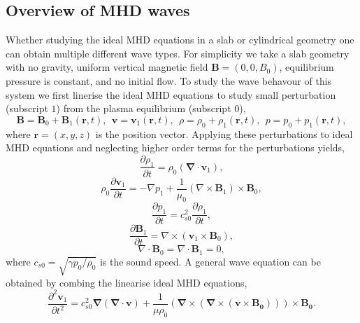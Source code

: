 \documentclass[12pt]{ociamthesis}
\newcommand{\bs}[1]{\boldsymbol{#1}}
\newcommand{\bn}{\boldsymbol{\nabla}}
\begin{document}
\subsection{Overview of MHD waves}
\label{section:kink_saus}
Whether studying the ideal MHD equations in a slab or cylindrical geometry one can obtain multiple different wave types. For simplicity we take a slab geometry with no gravity, uniform vertical magnetic field $\bs{B}=(0,0,B_0)$, equilibrium pressure is constant, and no initial flow. To study the wave behavour of this system we first linerise the ideal MHD equations to study small perturbation (subscript $1$) from the plasma equilibrium (subscript $0$), 
\begin{equation} \label{eq91}
\boldsymbol{B} = \boldsymbol{B}_0 + \boldsymbol{B}_1 (\boldsymbol{r},t) , \ \ \boldsymbol{v} = \boldsymbol{v}_1 (\boldsymbol{r}, t) , \ \ \rho = \rho_0 + \rho_1 ( \boldsymbol{r},t) , \ \ p = p_0 + p_1 ( \boldsymbol{r}, t) ,
\end{equation}
where $\bs{r} = (x,y,z)$ is the position vector. Applying these perturbations to ideal MHD equations and neglecting higher order terms for the perturbations yields,
\begin{equation}
\frac{\partial \rho_1}{\partial t} = \rho_0 ( \bn \cdot \boldsymbol{v}_1),
\end{equation}
\begin{equation}
\rho_0 \frac{\partial \boldsymbol{v}_1}{\partial t}  = - \nabla p_1 + \frac{1}{\mu_0} (\nabla \times \boldsymbol{B}_1) \times \boldsymbol{B}_0,
\end{equation}
\begin{equation}
\frac{\partial p_1}{\partial t} = c^2_{s0}  \frac{\partial \rho_1}{ \partial t},
\end{equation}
\begin{equation}
\frac{\partial \boldsymbol{B}_1}{\partial t} = \nabla \times (\boldsymbol{v}_1 \times \boldsymbol{B}_0),
\end{equation}
\begin{equation}
\nabla \cdot \boldsymbol{B}_0 = \nabla \cdot \boldsymbol{B}_1 = 0 ,
\end{equation}
where $c_{s0} = \sqrt{\gamma p_0/ \rho_0}$ is the sound speed. A general wave equation can be obtained by combing the linearise ideal MHD equations,
\begin{equation}\label{wave_eq}
    \frac{\partial^2 \bs{v}_1}{\partial t^2} = c_{s0}^2 \bn (\bn \cdot \bs{v}) + \frac{1}{\mu \rho_0} (\bn \times (\bn \times (\bs{v}\times\bs{B_0}))) \times \bs{B_0}.
\end{equation}
\end{document}
